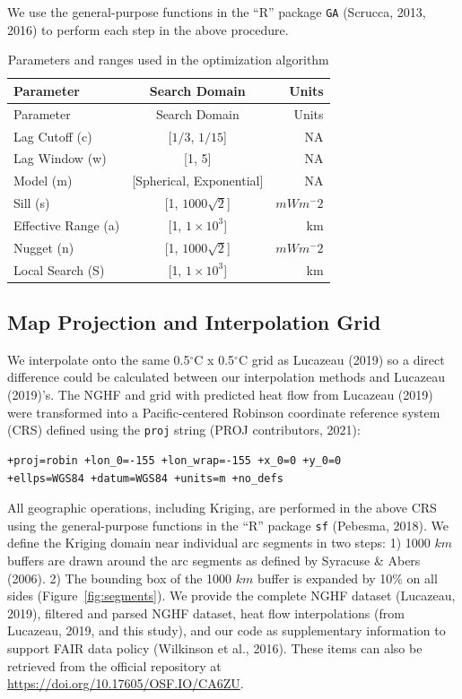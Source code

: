 \documentclass[draft,linenumbers]{agujournal2018}
\begin{document}
We use the general-purpose functions in the ``R'' package \texttt{GA}
(Scrucca, 2013, 2016) to perform each step in the above procedure.

\hypertarget{tbl:search}{}
\begin{longtable}[]{@{}lcr@{}}
\caption{\label{tbl:search}Parameters and ranges used in the
optimization algorithm}\tabularnewline
\toprule
Parameter & Search Domain & Units \\
\midrule
\endfirsthead
\toprule
Parameter & Search Domain & Units \\
\midrule
\endhead
Lag Cutoff (c) & {[}\(1/3\), \(1/15\){]} & NA \\
Lag Window (w) & {[}1, 5{]} & NA \\
Model (m) & {[}Spherical, Exponential{]} & NA \\
Sill (s) & {[}1, \(1000\sqrt{2}\){]} & \(mWm^-2\) \\
Effective Range (a) & {[}1, \(1\times 10^3\){]} & km \\
Nugget (n) & {[}1, \(1000\sqrt{2}\){]} & \(mWm^-2\) \\
Local Search (S) & {[}1, \(1\times 10^3\){]} & km \\
\bottomrule
\end{longtable}

\subsection{Map Projection and Interpolation Grid}

We interpolate onto the same 0.5\(^{\circ}\)C x 0.5\(^{\circ}\)C grid as
Lucazeau (2019) so a direct difference could be calculated between our
interpolation methods and Lucazeau (2019)'s. The NGHF and grid with
predicted heat flow from Lucazeau (2019) were transformed into a
Pacific-centered Robinson coordinate reference system (CRS) defined
using the \texttt{proj} string (PROJ contributors, 2021):

\begin{verbatim}
+proj=robin +lon_0=-155 +lon_wrap=-155 +x_0=0 +y_0=0
+ellps=WGS84 +datum=WGS84 +units=m +no_defs
\end{verbatim}

All geographic operations, including Kriging, are performed in the above
CRS using the general-purpose functions in the ``R'' package \texttt{sf}
(Pebesma, 2018). We define the Kriging domain near individual arc
segments in two steps: 1) 1000 \(km\) buffers are drawn around the arc
segments as defined by Syracuse \& Abers (2006). 2) The bounding box of
the 1000 \(km\) buffer is expanded by 10\% on all sides
(Figure~\ref{fig:segments}). We provide the complete NGHF dataset
(Lucazeau, 2019), filtered and parsed NGHF dataset, heat flow
interpolations (from Lucazeau, 2019, and this study), and our code as
supplementary information to support FAIR data policy (Wilkinson et al.,
2016). These items can also be retrieved from the official repository at
\url{https://doi.org/10.17605/OSF.IO/CA6ZU}.
\end{document}
